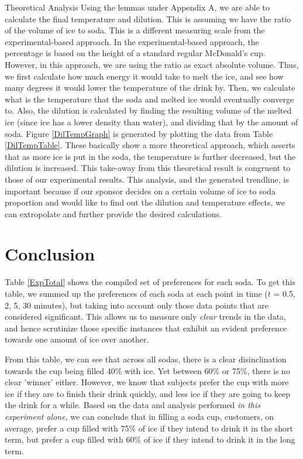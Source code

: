 \documentclass[oneside,12pt]{report}
\def\prefacesection#1{
\chapter*{#1}
\addcontentsline{toc}{chapter}{#1}
}
\begin{document}
\noindent Theoretical Analysis
\vspace{12pt}
\newline
Using the lemmas under Appendix A, we are able to calculate the final temperature and dilution. This is assuming we have the ratio of the volume of ice to soda. This is a different measuring scale from the experimental-based approach. In the experimental-based approach, the percentage is based on the height of a standard regular McDonald's cup. However, in this approach, we are using the ratio as exact absolute volume. Thus, we first calculate how much energy it would take to melt the ice, and see how many degrees it would lower the temperature of the drink by. Then, we calculate what is the temperature that the soda and melted ice would eventually converge to. Also, the dilution is calculated by finding the resulting volume of the melted ice (since ice has a lower density than water), and dividing that by the amount of soda.
\vspace{12pt}
\newline
Figure \ref{DilTempGraph} is generated by plotting the data from Table \ref{DilTempTable}. These basically show a more theoretical approach, which asserts that as more ice is put in the soda, the temperature is further decreased, but the dilution is increased. This take-away from this theoretical result is congruent to those of our experimental results.  This analysis, and the generated trendline, is important because if our sponsor decides on a certain volume of ice to soda proportion and would like to find out the dilution and temperature effects, we can extropolate and further provide the desired calculations. 

%

\prefacesection{Conclusion}

\vspace{24pt}
\noindent Table \ref{ExpTotal} shows the compiled set of preferences for each soda. To get this table,  we summed up the preferences of each soda at each point in time ($t$ = 0.5, 2, 5, 30 minutes), but taking into account only those data points that are considered significant. This allows us to measure only \emph{clear} trends in the data, and hence scrutinize those specific instances that exhibit an evident preference towards one amount of ice over another. 

\vspace{12pt}
\noindent From this table, we can see that across all sodas, there is a clear disinclination towards the cup being filled 40\% with ice. Yet between 60\% or 75\%, there is no clear 'winner' either. However, we know that subjects prefer the cup with more ice if they are to finish their drink quickly, and less ice if they are going to keep the drink for a while. Based on the data and analysis performed \emph{in this experiment alone}, we can conclude that in filling a soda cup, customers, on average, prefer a cup filled with 75\% of ice if they intend to drink it in the short term, but prefer a cup filled with 60\% of ice if they intend to drink it in the long term.
\end{document}

